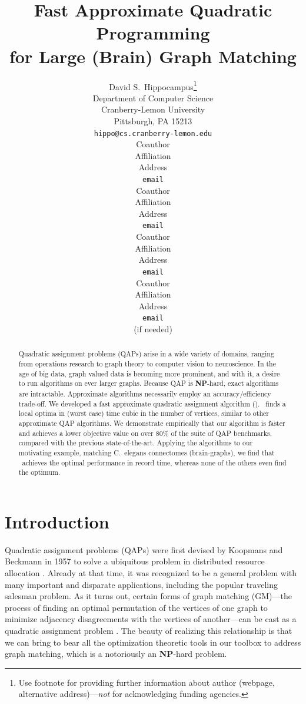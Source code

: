 \documentclass{article} %
\title{Fast Approximate Quadratic Programming \\ for Large (Brain) Graph Matching}
\author{
David S.~Hippocampus\thanks{ Use footnote for providing further information
about author (webpage, alternative address)---\emph{not} for acknowledging
funding agencies.} \\
Department of Computer Science\\
Cranberry-Lemon University\\
Pittsburgh, PA 15213 \\
\texttt{hippo@cs.cranberry-lemon.edu} \\
\And
Coauthor \\
Affiliation \\
Address \\
\texttt{email} \\
\AND
Coauthor \\
Affiliation \\
Address \\
\texttt{email} \\
\And
Coauthor \\
Affiliation \\
Address \\
\texttt{email} \\
\And
Coauthor \\
Affiliation \\
Address \\
\texttt{email} \\
(if needed)\\
}
\begin{document}
\maketitle

\begin{abstract}

Quadratic assignment problems (QAPs) arise in a wide variety of domains, ranging from operations research to graph theory to computer vision to neuroscience.  In the age of big data, graph valued data is becoming more prominent, and with it, a desire to run algorithms on ever larger graphs.  Because QAP is \textbf{NP}-hard, exact algorithms are intractable.  Approximate algorithms necessarily employ an accuracy/efficiency trade-off. We developed a fast approximate quadratic assignment algorithm (\FAQ). \FAQ\  finds a local optima in (worst case) time cubic in the number of vertices, similar to other approximate QAP algorithms.  We demonstrate empirically that our algorithm is faster and achieves a lower objective value on over $80\%$ of the suite of QAP benchmarks, compared with the previous state-of-the-art.  Applying the algorithms to our motivating example, matching C.~elegans connectomes (brain-graphs), we find that \FAQ\  achieves the optimal performance in record time, whereas none of the others even find the optimum.
\end{abstract}

\section{Introduction}

Quadratic assignment problems (QAPs) were first devised by Koopmans and Beckmann in 1957 to solve a ubiquitous problem in distributed resource allocation \cite{Koopmans1957}. 
Already at that time, it was recognized to be a general  problem with many important and disparate applications, including the  popular traveling salesman problem.  As it turns out, certain forms of graph matching (GM)---the process of finding an optimal permutation of the vertices of one graph to minimize adjacency disagreements with the vertices of another---can be cast as a quadratic assignment problem \cite{Umeyama1988}. The beauty of realizing this relationship is that we can bring to bear all the optimization theoretic tools in our toolbox to address graph matching, which is a notoriously an \textbf{NP}-hard problem.
\end{document}
